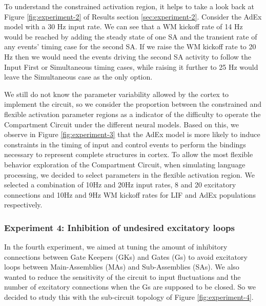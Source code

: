 \documentclass[10pt]{article}
\begin{document}
To understand the constrained activation region, it helps to take a look back at Figure \ref{fig:experiment-2} of Results section \ref{sec:experiment-2}.
Consider the AdEx model with a 30 Hz input rate.
We can see that a WM kickoff rate of 14 Hz would be reached by adding the steady state of one SA and the transient rate of any events' timing case for the second SA.
If we raise the WM kickoff rate to 20 Hz then we would need the events driving the second SA activity to follow the Input First or Simultaneous timing cases, while raising it further to 25 Hz would leave the Simultaneous case as the only option.

We still do not know the parameter variability allowed by the cortex to implement the circuit, so we consider the proportion between the constrained and flexible activation parameter regions as a indicator of the difficulty to operate the Compartment Circuit under the different neural models.
Based on this, we observe in Figure \ref{fig:experiment-3} that the AdEx model is more likely to induce constraints in the timing of input and control events to perform the bindings necessary to represent complete structures in cortex.
To allow the most flexible behavior exploration of the Compartment Circuit, when simulating language processing, we decided to select parameters in the flexible activation region.
We selected a combination of 10Hz and 20Hz input rates, 8 and 20 excitatory connections and 10Hz and 9Hz WM kickoff rates for LIF and AdEx populations respectively.


\subsubsection{Experiment 4: Inhibition of undesired excitatory loops}

{\label{554287}}

In the fourth experiment, we aimed at tuning the amount of inhibitory connections between Gate Keepers (GKs) and Gates (Gs) to avoid excitatory loops between Main-Assemblies (MAs) and Sub-Assemblies (SAs).
We also wanted to reduce the sensitivity of the circuit to input fluctuations and the number of excitatory connections when the Gs are supposed to be closed.
So we decided to study this with the sub-circuit topology of Figure \ref{fig:experiment-4}.
\end{document}
